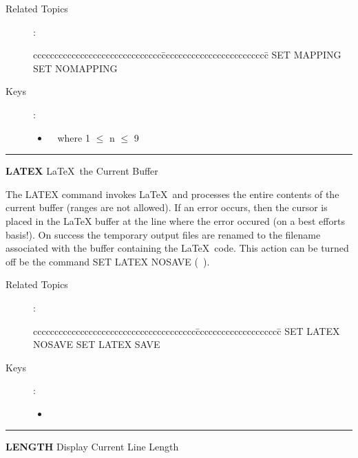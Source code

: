 \begin{description}
\item[Related Topics]:
\begin{tabbing}
cccccccccccccccccccccccccccccc\=ccccccccccccccccccccccccc\=\kill
SET MAPPING  \> SET NOMAPPING \\
\end{tabbing}

\item[Keys]:
          \begin{itemize}
          \item \gold\  where 1 $\leq$ n $\leq$ 9
          \end{itemize}

\end{description}

\goodbreak

\rule{\textwidth}{0.3mm}

{\Large {\bf LATEX} \hfill \LaTeX\ the Current Buffer}

\medskip
  The LATEX command invokes \LaTeX\ and processes the entire contents
  of the current buffer (ranges are not allowed). If an error occurs,
  then the cursor is placed in the LaTeX buffer at the line where the
  error occured (on a best efforts basis!). On success the temporary output
  files are renamed to the filename associated with the buffer containing the 
  \LaTeX\ code. This action can be turned off be the command SET LATEX NOSAVE
  (\gold\ ).

\begin{description}
\item[Related Topics]:
\begin{tabbing}
cccccccccccccccccccccccccccccccccccccc\=cccccccccccccccccccc\=\kill
SET LATEX NOSAVE    \> SET LATEX SAVE \\
\end{tabbing}

\item[Keys]:
          \begin{itemize}
          \item {}\ 
          \end{itemize}

\end{description}

\goodbreak

\rule{\textwidth}{0.3mm}

{\Large {\bf LENGTH} \hfill Display Current Line Length}

